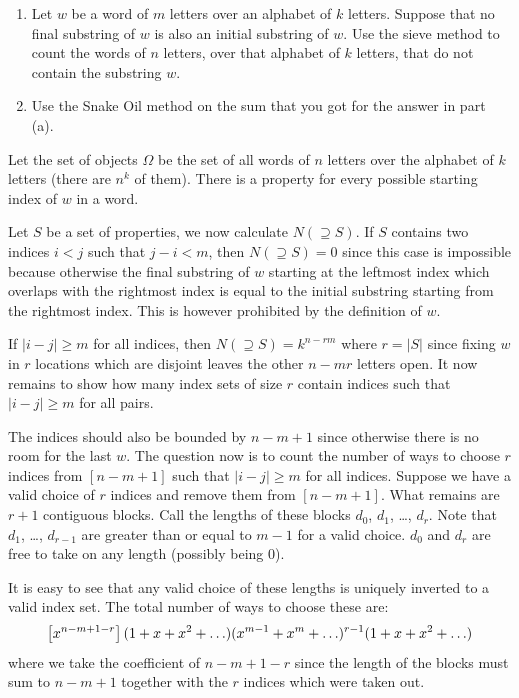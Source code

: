 \begin{exercise}
    \begin{enumerate}[label=(\alph*)]
        \item Let $w$ be a word of $m$ letters over an alphabet of $k$ letters. Suppose that no final substring of $w$ is also an initial substring of $w$. Use the sieve method to count the words of $n$ letters, over that alphabet of $k$ letters, that do not contain the substring $w$.
        \item Use the Snake Oil method on the sum that you got for the answer in part (a).
    \end{enumerate}
\end{exercise}
\begin{solution}
    Let the set of objects $\Omega$ be the set of all words of $n$ letters over the alphabet of $k$ letters (there are $n^k$ of them). There is a property for every possible starting index of $w$ in a word.

    Let $S$ be a set of properties, we now calculate $N(\supseteq S)$. If $S$ contains two indices $i < j$ such that $j-i < m$, then $N(\supseteq S) = 0$ since this case is impossible because otherwise the final substring of $w$ starting at the leftmost index which overlaps with the rightmost index is equal to the initial substring starting from the rightmost index. This is however prohibited by the definition of $w$.

    If $|i-j| \geq m$ for all indices, then $N(\supseteq S) = k^{n - rm}$ where $r = |S|$ since fixing $w$ in $r$ locations which are disjoint leaves the other $n-mr$ letters open. It now remains to show how many index sets of size $r$ contain indices such that $|i-j| \geq m$ for all pairs.

    The indices should also be bounded by $n-m+1$ since otherwise there is no room for the last $w$. The question now is to count the number of ways to choose $r$ indices from $[n-m+1]$ such that $|i-j| \geq m$ for all indices. Suppose we have a valid choice of $r$ indices and remove them from $[n-m+1]$. What remains are $r + 1$ contiguous blocks. Call the lengths of these blocks $d_0$, $d_1$, \ldots, $d_r$. Note that $d_1$, \ldots, $d_{r-1}$ are greater than or equal to $m-1$ for a valid choice. $d_0$ and $d_r$ are free to take on any length (possibly being $0$).

    It is easy to see that any valid choice of these lengths is uniquely inverted to a valid index set. The total number of ways to choose these are:
    \[
        \left[x^{n-m+1-r}\right] (1+x+x^2+\ldots)(x^{m-1}+x^{m}+\ldots)^{r-1}(1+x+x^2+\ldots)
    \]
    where we take the coefficient of $n-m+1-r$ since the length of the blocks must sum to $n-m+1$ together with the $r$ indices which were taken out.


\end{solution}
